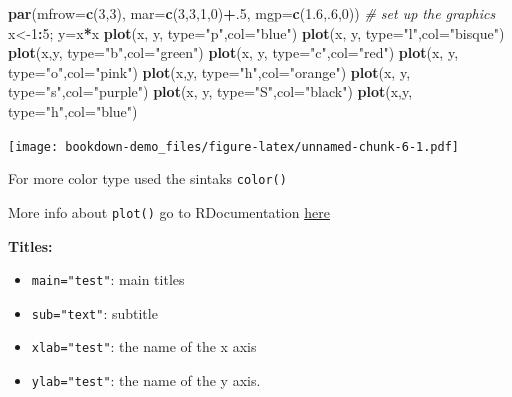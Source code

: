 \documentclass[]{book}
\newenvironment{Shaded}{\begin{snugshade}}{\end{snugshade}}
\newcommand{\KeywordTok}[1]{\textcolor[rgb]{0.13,0.29,0.53}{\textbf{#1}}}
\newcommand{\DataTypeTok}[1]{\textcolor[rgb]{0.13,0.29,0.53}{#1}}
\newcommand{\DecValTok}[1]{\textcolor[rgb]{0.00,0.00,0.81}{#1}}
\newcommand{\FloatTok}[1]{\textcolor[rgb]{0.00,0.00,0.81}{#1}}
\newcommand{\StringTok}[1]{\textcolor[rgb]{0.31,0.60,0.02}{#1}}
\newcommand{\CommentTok}[1]{\textcolor[rgb]{0.56,0.35,0.01}{\textit{#1}}}
\newcommand{\OperatorTok}[1]{\textcolor[rgb]{0.81,0.36,0.00}{\textbf{#1}}}
\newcommand{\NormalTok}[1]{#1}
\begin{document}
\begin{Shaded}
\begin{Highlighting}[]
\KeywordTok{par}\NormalTok{(}\DataTypeTok{mfrow=}\KeywordTok{c}\NormalTok{(}\DecValTok{3}\NormalTok{,}\DecValTok{3}\NormalTok{), }\DataTypeTok{mar=}\KeywordTok{c}\NormalTok{(}\DecValTok{3}\NormalTok{,}\DecValTok{3}\NormalTok{,}\DecValTok{1}\NormalTok{,}\DecValTok{0}\NormalTok{)}\OperatorTok{+}\NormalTok{.}\DecValTok{5}\NormalTok{, }\DataTypeTok{mgp=}\KeywordTok{c}\NormalTok{(}\FloatTok{1.6}\NormalTok{,.}\DecValTok{6}\NormalTok{,}\DecValTok{0}\NormalTok{))  }\CommentTok{# set up the graphics}
\NormalTok{x<-}\DecValTok{1}\OperatorTok{:}\DecValTok{5}\NormalTok{; y=x}\OperatorTok{*}\NormalTok{x}
\KeywordTok{plot}\NormalTok{(x, y, }\DataTypeTok{type=}\StringTok{"p"}\NormalTok{,}\DataTypeTok{col=}\StringTok{"blue"}\NormalTok{)}
\KeywordTok{plot}\NormalTok{(x, y, }\DataTypeTok{type=}\StringTok{"l"}\NormalTok{,}\DataTypeTok{col=}\StringTok{"bisque"}\NormalTok{)}
\KeywordTok{plot}\NormalTok{(x,y, }\DataTypeTok{type=}\StringTok{"b"}\NormalTok{,}\DataTypeTok{col=}\StringTok{"green"}\NormalTok{)}
\KeywordTok{plot}\NormalTok{(x, y, }\DataTypeTok{type=}\StringTok{"c"}\NormalTok{,}\DataTypeTok{col=}\StringTok{"red"}\NormalTok{)}
\KeywordTok{plot}\NormalTok{(x, y, }\DataTypeTok{type=}\StringTok{"o"}\NormalTok{,}\DataTypeTok{col=}\StringTok{"pink"}\NormalTok{)}
\KeywordTok{plot}\NormalTok{(x,y, }\DataTypeTok{type=}\StringTok{"h"}\NormalTok{,}\DataTypeTok{col=}\StringTok{"orange"}\NormalTok{)}
\KeywordTok{plot}\NormalTok{(x, y, }\DataTypeTok{type=}\StringTok{"s"}\NormalTok{,}\DataTypeTok{col=}\StringTok{"purple"}\NormalTok{)}
\KeywordTok{plot}\NormalTok{(x, y, }\DataTypeTok{type=}\StringTok{"S"}\NormalTok{,}\DataTypeTok{col=}\StringTok{"black"}\NormalTok{)}
\KeywordTok{plot}\NormalTok{(x,y, }\DataTypeTok{type=}\StringTok{"h"}\NormalTok{,}\DataTypeTok{col=}\StringTok{"blue"}\NormalTok{)}
\end{Highlighting}
\end{Shaded}

\texttt{[image: bookdown-demo\_files/figure-latex/unnamed-chunk-6-1.pdf]}

For more color type used the sintaks \texttt{color()}

More info about \texttt{plot()} go to RDocumentation
\href{https://www.rdocumentation.org/packages/graphics/versions/3.5.1/topics/plot}{here}

\textbf{Titles: }

\begin{itemize}
\item
  \texttt{main="test"}: main titles
\item
  \texttt{sub="text"}: subtitle
\item
  \texttt{xlab="test"}: the name of the x axis
\item
  \texttt{ylab="test"}: the name of the y axis.
\end{itemize}
\end{document}
